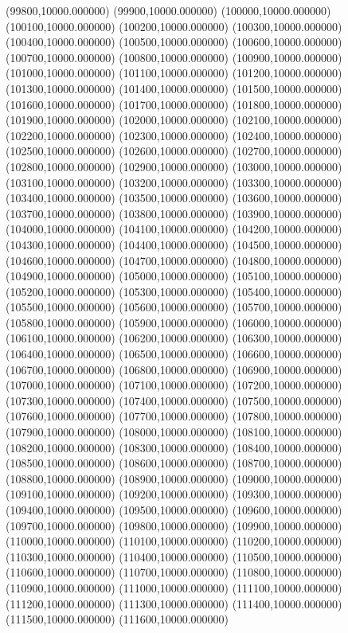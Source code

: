 (99800,10000.000000)
(99900,10000.000000)
(100000,10000.000000)
(100100,10000.000000)
(100200,10000.000000)
(100300,10000.000000)
(100400,10000.000000)
(100500,10000.000000)
(100600,10000.000000)
(100700,10000.000000)
(100800,10000.000000)
(100900,10000.000000)
(101000,10000.000000)
(101100,10000.000000)
(101200,10000.000000)
(101300,10000.000000)
(101400,10000.000000)
(101500,10000.000000)
(101600,10000.000000)
(101700,10000.000000)
(101800,10000.000000)
(101900,10000.000000)
(102000,10000.000000)
(102100,10000.000000)
(102200,10000.000000)
(102300,10000.000000)
(102400,10000.000000)
(102500,10000.000000)
(102600,10000.000000)
(102700,10000.000000)
(102800,10000.000000)
(102900,10000.000000)
(103000,10000.000000)
(103100,10000.000000)
(103200,10000.000000)
(103300,10000.000000)
(103400,10000.000000)
(103500,10000.000000)
(103600,10000.000000)
(103700,10000.000000)
(103800,10000.000000)
(103900,10000.000000)
(104000,10000.000000)
(104100,10000.000000)
(104200,10000.000000)
(104300,10000.000000)
(104400,10000.000000)
(104500,10000.000000)
(104600,10000.000000)
(104700,10000.000000)
(104800,10000.000000)
(104900,10000.000000)
(105000,10000.000000)
(105100,10000.000000)
(105200,10000.000000)
(105300,10000.000000)
(105400,10000.000000)
(105500,10000.000000)
(105600,10000.000000)
(105700,10000.000000)
(105800,10000.000000)
(105900,10000.000000)
(106000,10000.000000)
(106100,10000.000000)
(106200,10000.000000)
(106300,10000.000000)
(106400,10000.000000)
(106500,10000.000000)
(106600,10000.000000)
(106700,10000.000000)
(106800,10000.000000)
(106900,10000.000000)
(107000,10000.000000)
(107100,10000.000000)
(107200,10000.000000)
(107300,10000.000000)
(107400,10000.000000)
(107500,10000.000000)
(107600,10000.000000)
(107700,10000.000000)
(107800,10000.000000)
(107900,10000.000000)
(108000,10000.000000)
(108100,10000.000000)
(108200,10000.000000)
(108300,10000.000000)
(108400,10000.000000)
(108500,10000.000000)
(108600,10000.000000)
(108700,10000.000000)
(108800,10000.000000)
(108900,10000.000000)
(109000,10000.000000)
(109100,10000.000000)
(109200,10000.000000)
(109300,10000.000000)
(109400,10000.000000)
(109500,10000.000000)
(109600,10000.000000)
(109700,10000.000000)
(109800,10000.000000)
(109900,10000.000000)
(110000,10000.000000)
(110100,10000.000000)
(110200,10000.000000)
(110300,10000.000000)
(110400,10000.000000)
(110500,10000.000000)
(110600,10000.000000)
(110700,10000.000000)
(110800,10000.000000)
(110900,10000.000000)
(111000,10000.000000)
(111100,10000.000000)
(111200,10000.000000)
(111300,10000.000000)
(111400,10000.000000)
(111500,10000.000000)
(111600,10000.000000)
